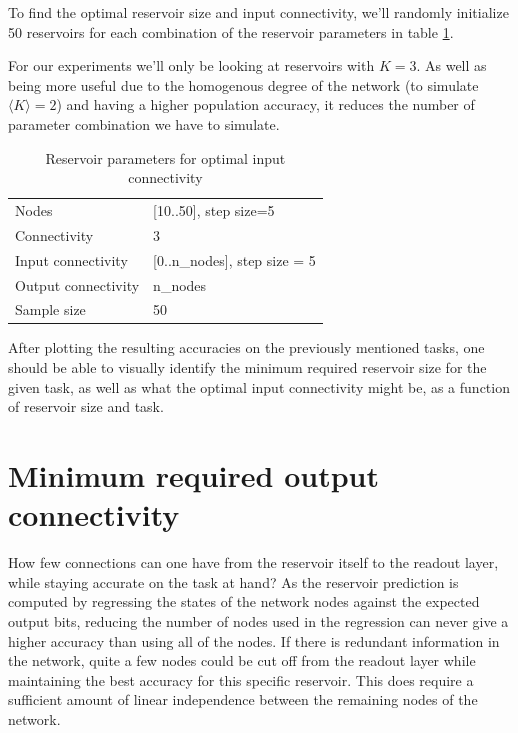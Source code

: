 To find the optimal reservoir size and input connectivity,
we'll randomly initialize 50 reservoirs for each combination of the reservoir parameters in table \ref{tab:ic-reservoir-parameters}.

For our experiments we'll only be looking at reservoirs with $K=3$.
As well as being more useful due to the homogenous degree of the network (to simulate $\langle K \rangle = 2 $) and
having a higher population accuracy, it reduces the number of parameter combination we have to simulate.

\begin{table}[ht]
    \centering
    \caption{Reservoir parameters for optimal input connectivity}
    \label{tab:ic-reservoir-parameters}
    \begin{tabular}{ll}
        Nodes               & [10..50], step size=5         \\
        Connectivity        & 3                             \\
        Input connectivity  & [0..n\_nodes], step size = 5  \\
		Output connectivity & n\_nodes                      \\
        Sample size         & 50
    \end{tabular}
\end{table}

After plotting the resulting accuracies on the previously mentioned tasks,
one should be able to visually identify the minimum required reservoir size for the given task,
as well as what the optimal input connectivity might be, as a function of reservoir size and task.

\section{Minimum required output connectivity}

How few connections can one have from the reservoir itself to the readout layer,
while staying accurate on the task at hand?
As the reservoir prediction is computed by regressing the states of the network nodes against the expected output bits,
reducing the number of nodes used in the regression can never give a higher accuracy than using all of the nodes.
If there is redundant information in the network, quite a few nodes could be cut off from the readout layer while maintaining the best accuracy for this specific reservoir.
This does require a sufficient amount of linear independence between the remaining nodes of the network.


